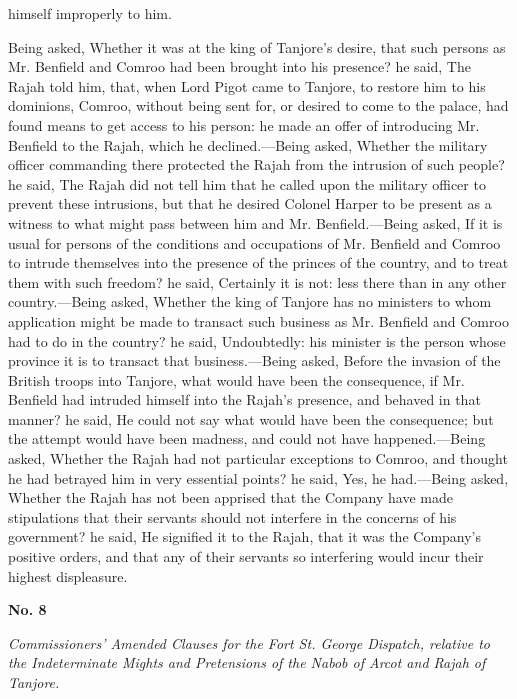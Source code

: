 himself improperly to him.

Being asked, Whether it was at the king of Tanjore's desire, that such persons as Mr. Benfield and Comroo had been brought into his presence? he said, The Rajah told him, that, when Lord Pigot came to Tanjore, to restore him to his dominions, Comroo, without being sent for, or desired to come to the palace, had found means to get access to his person: he made an offer of introducing Mr. Benfield to the Rajah, which he declined.—Being asked, Whether the military officer commanding there protected the Rajah from the intrusion of such people? he said, The Rajah did not tell him that he called upon the military officer to prevent these intrusions, but that he desired Colonel Harper to be present as a witness to what might pass between him and Mr. Benfield.—Being asked, If it is usual for persons of the conditions and occupations of Mr. Benfield and Comroo to intrude themselves into the presence of the princes of the country, and to treat them with such freedom? he said, Certainly it is not: less there than in any other country.—Being asked, Whether the king of Tanjore has no ministers to whom application might be made to transact such business as Mr. Benfield and Comroo had to do in the country? he said, Undoubtedly: his minister is the person whose province it is to transact that business.—Being asked, Before the invasion of the British troops into Tanjore, what would have been the consequence, if Mr. Benfield had intruded himself into the Rajah's presence, and behaved in that manner? he said, He could not say what would have been the consequence; but the attempt would have been madness, and could not have happened.—Being asked, Whether the Rajah had not particular exceptions to Comroo, and thought he had betrayed him in very essential points? he said, Yes, he had.—Being asked, Whether the Rajah has not been apprised that the Company have made stipulations that their servants should not interfere in the concerns of his government? he said, He signified it to the Rajah, that it was the Company's positive orders, and that any of their servants so interfering would incur their highest displeasure.

\PRLsep
\begin{center}
  \textbf{\large No. 8} \par 
\end{center}
\textit{Commissioners' Amended Clauses for the Fort St. George Dispatch, relative to the Indeterminate Mights and Pretensions of the Nabob of Arcot and Rajah of Tanjore.}
\vspace{0.3cm}

